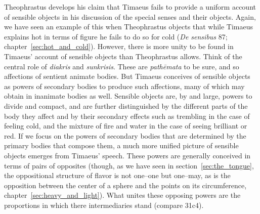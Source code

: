 Theophrastus develops his claim that Timaeus fails to provide a uniform account of sensible objects in his discussion of the special senses and their objects. Again, we have seen an example of this when Theophrastus objects that while Timaeus explains hot in terms of figure he fails to do so for cold (\emph{De sensibus} 87; chapter~\ref{sec:hot_and_cold}). However, there is more unity to be found in Timaeus' account of sensible objects than Theophrastus allows. Think of the central role of \emph{diakris} and \emph{sunkrisis}. These are \emph{pathēmata} to be sure, and so affections of sentient animate bodies. But Timaeus conceives of sensible objects as powers of secondary bodies to produce such affections, many of which may obtain in inanimate bodies as well. Sensible objects are, by and large, powers to divide and compact, and are further distinguished by the different parts of the body they affect and by their secondary effects such as trembling in the case of feeling cold, and the mixture of fire and water in the case of seeing brilliant or red. If we focus on the powers of secondary bodies that are determined by the primary bodies that compose them, a much more unified picture of sensible objects emerges from Timaeus' speech. These powers are generally conceived in terms of pairs of opposites (though, as we have seen in section~\ref{sec:the_tongue}, the oppositional structure of flavor is not one--one but one--may, as is the opposition between the center of a sphere and the points on its circumference, chapter~\ref{sec:heavy_and_light}). What unites these opposing powers are the proportions in which there intermediaries stand (compare 31c4).


